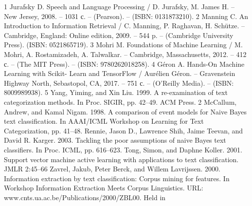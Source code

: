 \clearpage                                  %
{}	%
\insertbiblioother                          %


\begin{thebibliography}
	{1} 
	 Jurafsky D. Speech and Language Processing / D. Jurafsky, M. James   H. – New Jersey, 2008. – 1031 с. – (Pearson). – (ISBN: 0131873210). 
	 {2}
	  Manning C. An Introduction to Information Retrieval / C. Manning, P. Raghavan, H. Schütze. – Cambridge, England: Online edition, 2009. – 544 p. – (Cambridge University Press).  (ISBN: 0521865719).
	 {3}
	   Mohri M. Foundations of Machine Learning / M. Mohri, A. Rostamizadeh, A. Talwalkar. – Cambridge, Massachusetts, 2012. – 412 с. – (The MIT Press). – (ISBN: 9780262018258).
	 {4}
	  Géron A. Hands-On Machine Learning with Scikit- Learn and TensorFlow / Aurélien Géron. – Gravenstein Highway North, Sebastopol, CA, 2017. – 751 с. – (O’Reilly Media). – (ISBN: 8009989938).
	 {5}
	 Yang, Yiming, and Xin Liu. 1999. A re-examination of text categorization methods.
	 In Proc. SIGIR, pp. 42–49. ACM Press. 2
	 {}
	 McCallum, Andrew, and Kamal Nigam. 1998. A comparison of event models for
	 Naive Bayes text classification. In AAAI/ICML Workshop on Learning for Text Categorization,
	 pp. 41–48.
	 {}
	 Rennie, Jason D., Lawrence Shih, Jaime Teevan, and David R. Karger. 2003. Tackling
	 the poor assumptions of naive Bayes text classifiers. In Proc. ICML, pp. 616–623.
	 {}
	  Tong, Simon, and Daphne Koller. 2001. Support vector machine active learning with
	 applications to text classification. JMLR 2:45–66
	 {}
	 Zavrel, Jakub, Peter Berck, and Willem Lavrijssen. 2000. Information extraction by text classification: Corpus mining for features. In Workshop Information Extraction
	 Meets Corpus Linguistics. URL: www.cnts.ua.ac.be/Publications/2000/ZBL00. Held in

\end{thebibliography}
